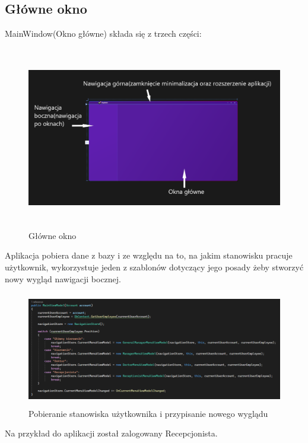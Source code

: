 \begin{flushleft}
    \subsection{\Large{Główne okno}}
    \hspace{5mm}MainWindow(Okno główne) składa się z trzech części:
    \begin{figure}[H]
	\begin{center}
	\includegraphics[height=8cm]{images/mainwindow.png}
        \caption{Główne okno}
        \label{fig:okn_glow}
	\end{center}
    \end{figure}
    \hspace{5mm}Aplikacja pobiera dane z bazy i ze względu na to, na jakim stanowisku pracuje użytkownik, wykorzystuje jeden z szablonów dotyczący jego posady żeby stworzyć nowy wygląd nawigacji bocznej.
    \begin{figure}[H]
	\begin{center}
	\includegraphics[height=5cm]{images/mainviewmodel_const.png}
        \caption{Pobieranie stanowiska użytkownika i przypisanie nowego wyglądu}
        \label{fig:main_vm_const}
	\end{center}
    \end{figure}
    \hspace{5mm}Na przykład do aplikacji został zalogowany Recepcjonista.

\end{flushleft}
